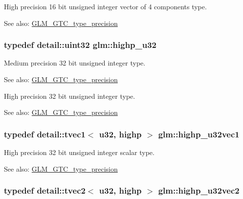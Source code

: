 High precision 16 bit unsigned integer vector of 4 components type. \begin{Desc}
\item[See also:]\hyperlink{group__gtc__type__precision}{GLM\_\-GTC\_\-type\_\-precision} \end{Desc}
\hypertarget{group__gtc__type__precision_ge8e8a2c712653891a03c171795286ac5}{
\subsubsection[highp\_\-u32]{\setlength{\rightskip}{0pt plus 5cm}typedef detail::uint32 {\bf glm::highp\_\-u32}}}
\label{group__gtc__type__precision_ge8e8a2c712653891a03c171795286ac5}


Medium precision 32 bit unsigned integer type. \begin{Desc}
\item[See also:]\hyperlink{group__gtc__type__precision}{GLM\_\-GTC\_\-type\_\-precision}\end{Desc}
High precision 32 bit unsigned integer type. \begin{Desc}
\item[See also:]\hyperlink{group__gtc__type__precision}{GLM\_\-GTC\_\-type\_\-precision} \end{Desc}
\hypertarget{group__gtc__type__precision_g8a92d1f79e2fd4a03be803e35aac8e1b}{
\subsubsection[highp\_\-u32vec1]{\setlength{\rightskip}{0pt plus 5cm}typedef detail::tvec1$<$ u32, highp $>$ {\bf glm::highp\_\-u32vec1}}}
\label{group__gtc__type__precision_g8a92d1f79e2fd4a03be803e35aac8e1b}


High precision 32 bit unsigned integer scalar type. \begin{Desc}
\item[See also:]\hyperlink{group__gtc__type__precision}{GLM\_\-GTC\_\-type\_\-precision} \end{Desc}
\hypertarget{group__gtc__type__precision_gddb81e8e12bd640e188744ed372c95bb}{
\subsubsection[highp\_\-u32vec2]{\setlength{\rightskip}{0pt plus 5cm}typedef detail::tvec2$<$ u32, highp $>$ {\bf glm::highp\_\-u32vec2}}}
\label{group__gtc__type__precision_gddb81e8e12bd640e188744ed372c95bb}


